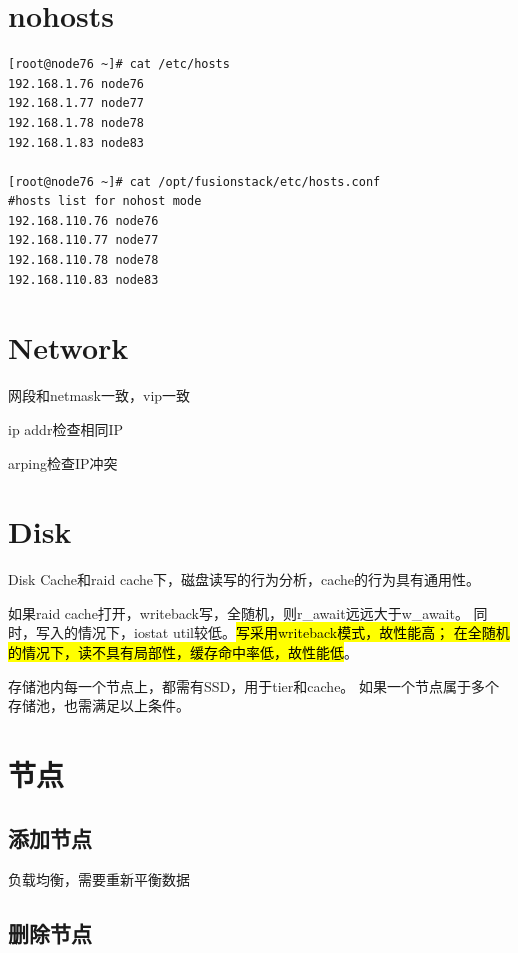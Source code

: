 \section{nohosts}

\begin{lstlisting}[frame=single]
[root@node76 ~]# cat /etc/hosts
192.168.1.76 node76
192.168.1.77 node77
192.168.1.78 node78
192.168.1.83 node83

[root@node76 ~]# cat /opt/fusionstack/etc/hosts.conf 
#hosts list for nohost mode
192.168.110.76 node76
192.168.110.77 node77
192.168.110.78 node78
192.168.110.83 node83
\end{lstlisting}

\section{Network}

网段和netmask一致，vip一致

ip addr检查相同IP

arping检查IP冲突 

\section{Disk}

Disk Cache和raid cache下，磁盘读写的行为分析，cache的行为具有通用性。

如果raid cache打开，writeback写，全随机，则r\_await远远大于w\_await。
同时，写入的情况下，iostat util较低。\hl{写采用writeback模式，故性能高；
在全随机的情况下，读不具有局部性，缓存命中率低，故性能低}。

\begin{tcolorbox}
存储池内每一个节点上，都需有SSD，用于tier和cache。
如果一个节点属于多个存储池，也需满足以上条件。
\end{tcolorbox}

\section{节点}

\subsection{添加节点}

负载均衡，需要重新平衡数据

\subsection{删除节点}


